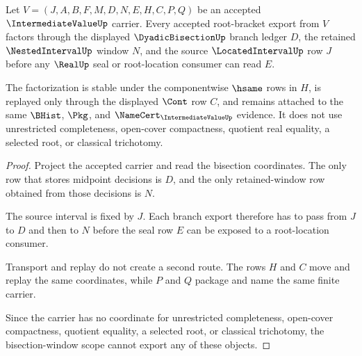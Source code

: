 \begin{theorem}
\label{thm:intermediatevalue-bisection-window-scope}
Let $V=(J,A,B,F,M,D,N,E,H,C,P,Q)$ be an accepted $\IntermediateValueUp$ carrier. Every accepted root-bracket export from $V$ factors through the displayed $\DyadicBisectionUp$ branch ledger $D$, the retained $\NestedIntervalUp$ window $N$, and the source $\LocatedIntervalUp$ row $J$ before any $\RealUp$ seal or root-location consumer can read $E$.

The factorization is stable under the componentwise $\hsame$ rows in $H$, is replayed only through the displayed $\Cont$ row $C$, and remains attached to the same $\BHist$, $\Pkg$, and $\NameCert_{\IntermediateValueUp}$ evidence. It does not use unrestricted completeness, open-cover compactness, quotient real equality, a selected root, or classical trichotomy.
\end{theorem}
\begin{proof}
Project the accepted carrier and read the bisection coordinates. The only row that stores midpoint decisions is $D$, and the only retained-window row obtained from those decisions is $N$.

The source interval is fixed by $J$. Each branch export therefore has to pass from $J$ to $D$ and then to $N$ before the seal row $E$ can be exposed to a root-location consumer.

Transport and replay do not create a second route. The rows $H$ and $C$ move and replay the same coordinates, while $P$ and $Q$ package and name the same finite carrier.

Since the carrier has no coordinate for unrestricted completeness, open-cover compactness, quotient equality, a selected root, or classical trichotomy, the bisection-window scope cannot export any of these objects.
\end{proof}

